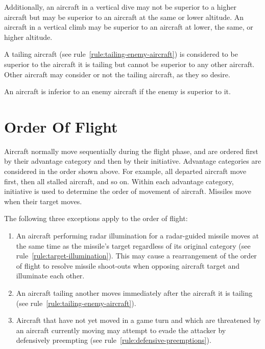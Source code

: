 {Additionally, an aircraft in a vertical dive may not be superior to a higher aircraft but may be superior to an aircraft at the same or lower altitude. An aircraft in a vertical climb may be superior to an aircraft at lower, the same, or higher altitude.

A tailing aircraft (see rule~\ref{rule:tailing-enemy-aircraft}) is considered to be superior to the aircraft it is tailing but cannot be superior to any other aircraft. Other aircraft may consider or not the tailing aircraft, as they so desire.

An aircraft is inferior to an enemy aircraft if the enemy is superior to it.

\section{Order Of Flight} 

Aircraft normally move sequentially during the flight phase, and are ordered first by their advantage category and then by their initiative. Advantage categories are considered in the order shown above. For example, all departed aircraft move first, then all stalled aircraft, and so on. Within each advantage category, initiative is used to determine the order of movement of aircraft. Missiles move when their target moves.

The following three exceptions apply to the order of flight:

\begin{enumerate}

    \item{} An aircraft performing radar illumination for a radar-guided missile moves at the same time as the missile’s target regardless of its original category (see rule~\ref{rule:target-illumination}). This may cause a rearrangement of the order of flight to resolve missile shoot-outs when opposing aircraft target and illuminate each other.

    \item{} An aircraft tailing another moves immediately after the aircraft it is tailing (see rule~\ref{rule:tailing-enemy-aircraft}).

    \item{} Aircraft that have not yet moved in a game turn and which are threatened by an aircraft currently moving may attempt to evade the attacker by defensively preempting (see rule~\ref{rule:defensive-preemptions}).
    
\end{enumerate}


}

